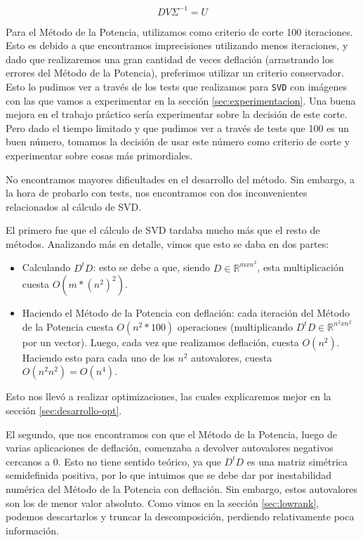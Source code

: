 \begin{equation*}
	D V \Sigma^{-1} = U
\end{equation*}

Para el Método de la Potencia, utilizamos como criterio de corte 100 iteraciones.
Esto es debido a que encontramos imprecisiones utilizando menos iteraciones,
y dado que realizaremos una gran cantidad de veces deflación (arrastrando los errores del Método de la Potencia),
preferimos utilizar un criterio conservador. Esto lo pudimos ver a través de los tests que realizamos para \verb|SVD| con imágenes con las que vamos a experimentar en la sección \ref{sec:experimentacion}. Una buena mejora en el trabajo práctico sería experimentar sobre la decisión de este corte. Pero dado el tiempo limitado y que pudimos ver a través de tests que 100 es un buen número, tomamos la decisión de usar este número como criterio de corte y experimentar sobre cosas más primordiales.

No encontramos mayores dificultades en el desarrollo del método.
Sin embargo, a la hora de probarlo con tests,
nos encontramos con dos inconvenientes relacionados al cálculo de SVD.

El primero fue que el cálculo de SVD tardaba mucho más que el resto de métodos.
Analizando más en detalle, vimos que esto se daba en dos partes:
\begin{itemize}
	\item Calculando $D^{t} D$: esto se debe a que, siendo $D \in \mathbb{R}^{mxn^{2}}$,
		esta multiplicación cuesta $O(m * (n^2)^2)$.
	\item Haciendo el Método de la Potencia con deflación:
		cada iteración del Método de la Potencia cuesta $O(n^2 * 100)$ operaciones
		(multiplicando $D^{t} D \in \mathbb{R}^{n^{2}xn^{2}}$ por un vector).
		Luego, cada vez que realizamos deflación, cuesta $O(n^{2})$.
		Haciendo esto para cada uno de los $n^2$ autovalores, cuesta $O(n^2 n^2) = O(n^4)$.
\end{itemize}

Esto nos llevó a realizar optimizaciones, las cuales explicaremos mejor en la sección \ref{sec:desarrollo-opt}.

El segundo, que nos encontramos con que el Método de la Potencia,
luego de varias aplicaciones de deflación, comenzaba a devolver autovalores negativos cercanos a 0.
Esto no tiene sentido teórico, ya que $D^{t} D$ es una matriz simétrica semidefinida positiva,
por lo que intuimos que se debe dar por inestabilidad numérica del Método de la Potencia con deflación.
Sin embargo, estos autovalores son los de menor valor absoluto.
Como vimos en la sección \ref{sec:lowrank}, podemos descartarlos y truncar la descomposición,
perdiendo relativamente poca información.

